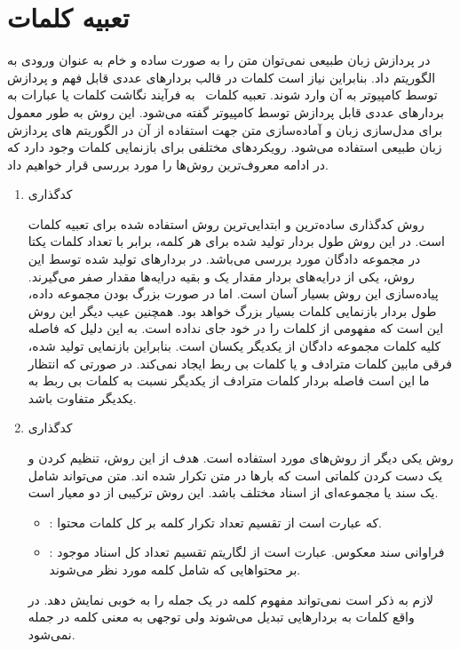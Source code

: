 \section{تعبیه کلمات}
در پردازش زبان طبیعی نمی‌توان متن را به صورت ساده و خام به عنوان ورودی به الگوریتم داد. بنابراین نیاز است کلمات در قالب بردارهای عددی قابل فهم و پردازش توسط کامپیوتر به آن وارد شوند. تعبیه کلمات~
به فرآیند نگاشت کلمات یا عبارات به بردارهای عددی قابل پردازش توسط کامپیوتر گفته می‌شود. این روش به طور معمول برای مدل‌سازی زبان و آمادە‌سازی متن جهت استفاده از آن در الگوریتم های پردازش زبان طبیعی استفاده می‌شود. رویکردهای مختلفی برای بازنمایی کلمات وجود دارد که در ادامه معروف‌ترین روش‌ها را مورد بررسی قرار خواهیم داد.
\begin{enumerate}
	\item کدگذاری
	
	روش کدگذاری
	 سادە‌ترین و ابتدایی‌ترین روش استفاده شده برای تعبیه کلمات است. در این روش
	طول بردار تولید شده برای هر کلمه، برابر با تعداد کلمات یکتا در مجموعه دادگان مورد بررسی می‌باشد. در بردارهای تولید شده توسط این روش، یکی از درایە‌های بردار مقدار یک و بقیه درایە‌ها مقدار صفر می‌گیرند. پیادە‌سازی این روش بسیار آسان است. اما در صورت بزرگ بودن مجموعه داده، طول بردار بازنمایی کلمات بسیار بزرگ خواهد بود. همچنین عیب دیگر این روش این است که مفهومی از کلمات را در خود جای نداده است. به این دلیل که فاصله کلیه کلمات مجموعه دادگان از یکدیگر یکسان است. بنابراین بازنمایی تولید شده، فرقی مابین کلمات مترادف و یا کلمات بی ربط ایجاد نمی‌کند. در صورتی که انتظار ما این است 	فاصله بردار کلمات مترادف از یکدیگر نسبت به کلمات بی ربط به یکدیگر متفاوت باشد.
	\item کدگذاری
	
	روش
یکی دیگر از روش‌های مورد استفاده است. هدف از این روش، تنظیم کردن و یک دست کردن کلماتی است که بارها در متن تکرار شدە اند. متن می‌تواند شامل یک سند یا مجموعە‌ای از اسناد مختلف باشد. این روش ترکیبی از دو معیار است.
\begin{itemize}
	\item   
	 : 
	که عبارت است از تقسیم تعداد تکرار کلمه بر کل کلمات محتوا.
	\item   
	: 
	فراوانی سند معکوس. عبارت است از لگاریتم تقسیم تعداد کل اسناد موجود بر محتواهایی که شامل کلمه مورد نظر می‌شوند.
\end{itemize}
لازم به ذکر است
نمی‌تواند مفهوم کلمه در یک جمله را به خوبی نمایش دهد. در واقع کلمات به
بردارهایی تبدیل می‌شوند ولی توجهی به معنی کلمه در جمله نمی‌شود.


\end{enumerate}
